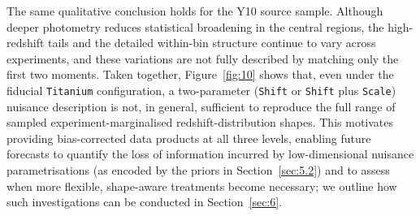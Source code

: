 The same qualitative conclusion holds for the Y10 source sample. Although deeper photometry reduces statistical broadening in the central regions, the high-redshift tails and the detailed within-bin structure continue to vary across experiments, and these variations are not fully described by matching only the first two moments. Taken together, Figure~\ref{fig:10} shows that, even under the fiducial \texttt{Titanium} configuration, a two-parameter (\texttt{Shift} or \texttt{Shift} plus \texttt{Scale}) nuisance description is not, in general, sufficient to reproduce the full range of sampled experiment-marginalised redshift-distribution shapes. This motivates providing bias-corrected data products at all three levels, enabling future forecasts to quantify the loss of information incurred by low-dimensional nuisance parametrisations (as encoded by the priors in Section~\ref{sec:5.2}) and to assess when more flexible, shape-aware treatments become necessary; we outline how such investigations can be conducted in Section~\ref{sec:6}.